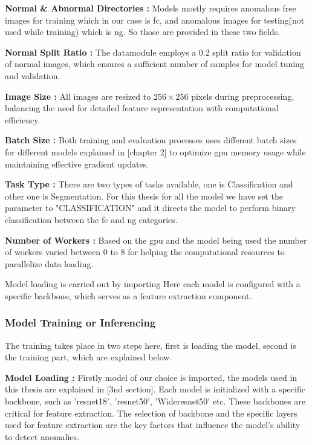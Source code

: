 \textbf{Normal \& Abnormal Directories :} Models mostly requires anomalous free images for training which in our case is \gls{fc}, and anomalous images for testing(not used while training) which is \gls{ng}. So those are provided in these two fields.

\textbf{Normal Split Ratio :} The datamodule employs a 0.2 split ratio for validation of normal images, which ensures a sufficient number of samples for model tuning and validation.

\textbf{Image Size :} All images are resized to $256 \times 256$ pixels during preprocessing, balancing the need for detailed feature representation with computational efficiency.

\textbf{Batch Size :} Both training and evaluation processes uses different batch sizes for different models explained in [chapter 2] to optimize \gls{gpu} memory usage while maintaining effective gradient updates.

\textbf{Task Type :} There are two types of tasks available, one is Classification and other one is Segmentation. For this thesis for all the model we have set the parameter to "CLASSIFICATION" and it directs the model to perform binary classification between the \gls{fc} and \gls{ng} categories.

\textbf{Number of Workers :} Based on the \gls{gpu} and the model being used the number of workers varied between 0 to 8 for helping the computational resources to parallelize data loading.



Model loading is carried out by importing Here each model is configured with a specific backbone, which serves as a feature extraction component. 

\subsubsection{Model Training or Inferencing}
\label{subsec:Model Training}

The training takes place in two steps here, first is loading the model, second is the training part, which are explained below.

\textbf{Model Loading :} Firstly model of our choice is imported, the models used in this thesis are explained in [3nd section]. Each model is initialized with a specific backbone, such as '\gls{resnet}18', '\gls{resnet}50', 'Wide\gls{resnet}50' etc. These backbones are critical for feature extraction. The selection of backbone and the specific layers used for feature extraction are the key factors that influence the model's ability to detect anomalies.

